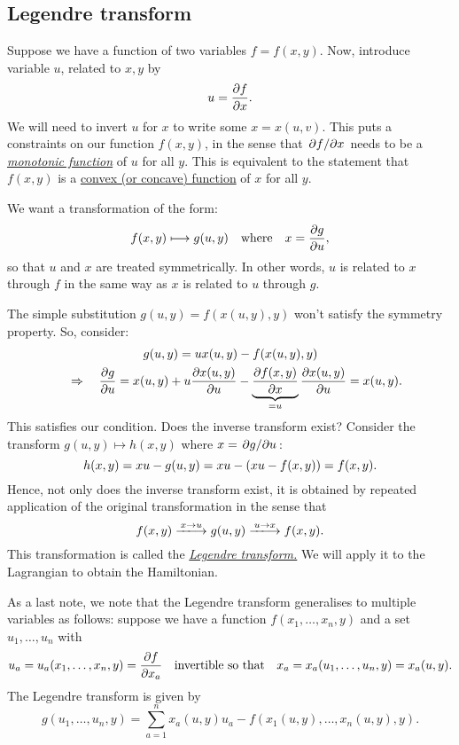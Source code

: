 \documentclass{article}
\begin{document}
\subsection{Legendre transform}
Suppose we have a function of two variables $ f = f(x,y) $. Now, introduce variable $ u $, related to $ x,y $ by
\begin{equation}
	u = \pdv{f}{x}.
\end{equation}
We will need to invert $ u $ for $ x $ to write some $ x = x(u,v) $. This puts a constraints on our function $ f(x,y) $, in the sense that $ \pdv*{f}{x} $ needs to be a \href{https://en.wikipedia.org/wiki/Monotonic_function}{\textit{monotonic function}} of $ u $ for all $ y. $ This is equivalent to the statement that $ f(x,y) $ is a \href{https://en.wikipedia.org/wiki/Convex_function}{convex (or concave) function} of $ x $ for all $ y $.
\par
We want a transformation of the form:
\begin{equation}
	f(x,y) \longmapsto g(u,y) \qq{where} x = \pdv{g}{u},
\end{equation}
so that $ u $ and $ x $ are treated symmetrically. In other words, $ u $ is related to $ x $ through $ f $ in the same way as $ x $ is related to $ u $ through $ g $. 
\par
The simple substitution $ g(u,y) = f(x(u,y),y) $ won't satisfy the symmetry property. So, consider:
\begin{gather}
	g(u,y) = ux(u,y) - f(x(u,y),y) \\
	\quad \Rightarrow \quad \pdv{g}{u} = x(u,y) + u \pdv{x(u,y)}{u} - \underbrace{\pdv{f(x,y)}{x}}_{=u}\pdv{x(u,y)}{u} = x(u,y).
\end{gather}
This satisfies our condition. Does the inverse transform exist? Consider the transform $ g(u,y) \longmapsto h(x,y) $ where $ x = \pdv*{g}{u} $:
\begin{equation}
	h(x,y) = xu - g(u, y) = xu - \qty(xu - f(x,y)) = f(x,y).
\end{equation}
Hence, not only does the inverse transform exist, it is obtained by repeated application of the original transformation in the sense that
\begin{equation}
	f(x,y) \xlongrightarrow{x \to u} g(u,y) \xlongrightarrow{u \to x} f(x,y).
\end{equation}
This transformation is called the \href{https://en.wikipedia.org/wiki/Legendre_transformation}{\textit{Legendre transform.}} We will apply it to the Lagrangian to obtain the Hamiltonian. 
\par
As a last note, we note that the Legendre transform generalises to multiple variables as follows: suppose we have a function $ f(x_{1},\dots,x_{n},y) $ and a set $ u_{1},\dots,u_{n} $ with
\[
	u_{a} = u_{a}(x_{1}, \dots, x_{n}, y) = \pdv{f}{x_{a}} \qq{invertible so that} x_{a} = x_{a}(u_{1}, \dots, u_{n}, y) = x_{a} (u, y).
\]
The Legendre transform is given by
\begin{equation}
	g(u_{1}, \dots, u_{n}, y) = \sum_{a=1}^{n} x_{a}(u,y) u_{a} - f(x_{1}(u,y), \dots, x_{n}(u,y), y).
\end{equation}
\end{document}
